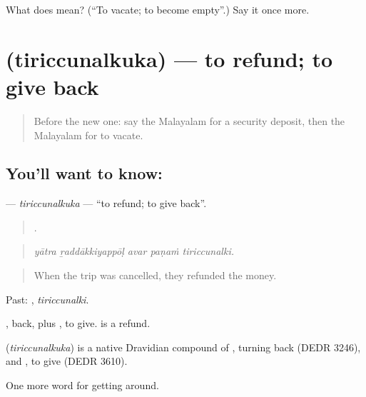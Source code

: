 \begin{tcolorbox}[breakable,colback=teal!4,colframe=teal!35!black,title={Before you move on}]
What does  mean? (\textquotedblleft{}To vacate; to become empty\textquotedblright{}.) Say it once more.
\end{tcolorbox}
\section[\texorpdfstring{\ml{തിരിച്ചുനൽകുക} (tiriccunalkuka)}{തിരിച്ചുനൽകുക (tiriccunalkuka)}]{ (tiriccunalkuka) — to refund; to give back}

\label{lesson:ML-C482-tiriccunalkuka}



\begin{quote}
Before the new one: say the Malayalam for a security deposit, then the Malayalam for to vacate.
\end{quote}

\subsection*{You'll want to know: }
\textbf{} — \emph{tiriccunalkuka} — \textquotedblleft{}to refund; to give back\textquotedblright{}.

\begin{quote}
    .
\end{quote}

\begin{quote}
\emph{yātra ṟaddākkiyappōḷ avar paṇaṁ tiriccunalki.}
\end{quote}

\begin{quote}
When the trip was cancelled, they refunded the money.
\end{quote}

Past: , \emph{tiriccunalki}.

, back, plus , to give.   is a refund.

\begin{cousinweb}
\textbf{} (\emph{tiriccunalkuka}) is a native Dravidian compound of , turning back (DEDR 3246), and , to give (DEDR 3610).
\end{cousinweb}

\begin{grammarlens}[title={What you've built}]
One more word for getting around.
\end{grammarlens}

